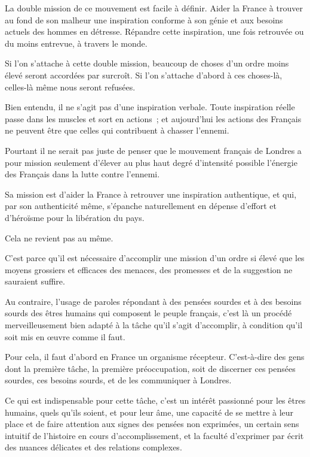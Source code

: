 \documentclass[french,twoside]{book} %
\begin{document}
La double mission de ce mouvement est facile à définir. Aider la France à trouver au fond de son malheur une inspiration conforme à son génie et aux besoins actuels des hommes en détresse. Répandre cette inspiration, une fois retrouvée ou du moins entrevue, à travers le monde.\par
Si l'on s'attache à cette double mission, beaucoup de choses d'un ordre moins élevé seront accordées par surcroît. Si l'on s'attache d'abord à ces choses-là, celles-là même nous seront refusées.\par
Bien entendu, il ne s'agit pas d'une inspiration verbale. Toute inspiration réelle passe dans les muscles et sort en actions ; et aujourd'hui les actions des Français ne peuvent être que celles qui contribuent à chasser l'ennemi.\par
Pourtant il ne serait pas juste de penser que le mouvement français de Londres a pour mission seulement d'élever au plus haut degré d'intensité possible l'énergie des Français dans la lutte contre l'ennemi.\par
Sa mission est d'aider la France à retrouver une inspiration authentique, et qui, par son authenticité même, s'épanche naturellement en dépense d'effort et d'héroïsme pour la libération du pays.\par
Cela ne revient pas au même.\par
C'est parce qu'il est nécessaire d'accomplir une mission d'un ordre si élevé que les moyens grossiers et efficaces des menaces, des promesses et de la suggestion ne sauraient suffire.\par
Au contraire, l'usage de paroles répondant à des pensées sourdes et à des besoins sourds des êtres humains qui composent le peuple français, c'est là un procédé merveilleusement bien adapté à la tâche qu'il s'agit d'accomplir, à condition qu'il soit mis en œuvre comme il faut.\par
Pour cela, il faut d'abord en France un organisme récepteur. C'est-à-dire des gens dont la première tâche, la première préoccupation, soit de discerner ces pensées sourdes, ces besoins sourds, et de les communiquer à Londres.\par
Ce qui est indispensable pour cette tâche, c'est un intérêt passionné pour les êtres humains, quels qu'ils soient, et pour leur âme, une capacité de se mettre à leur place et de faire attention aux signes des pensées non exprimées, un certain sens intuitif de l'histoire en cours d'accomplissement, et la faculté d'exprimer par écrit des nuances délicates et des relations complexes.\par
\end{document}
